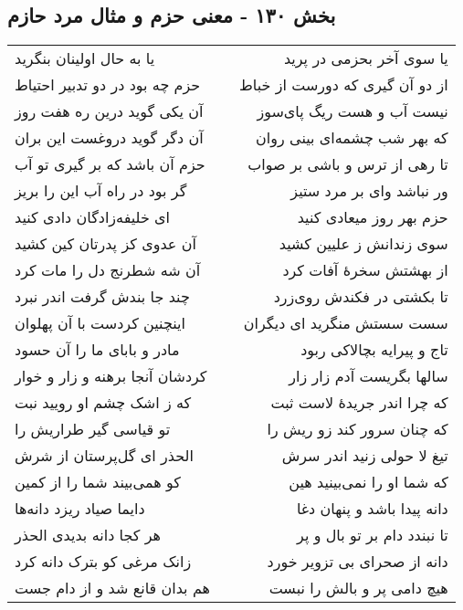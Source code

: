\begin{center}
\section*{بخش ۱۳۰ - معنی حزم و مثال مرد حازم}
\label{sec:sh130}
\begin{longtable}{l p{0.5cm} r}
یا به حال اولینان بنگرید
&&
یا سوی آخر بحزمی در پرید
\\
حزم چه بود در دو تدبیر احتیاط
&&
از دو آن گیری که دورست از خباط
\\
آن یکی گوید درین ره هفت روز
&&
نیست آب و هست ریگ پای‌سوز
\\
آن دگر گوید دروغست این بران
&&
که بهر شب چشمه‌ای بینی روان
\\
حزم آن باشد که بر گیری تو آب
&&
تا رهی از ترس و باشی بر صواب
\\
گر بود در راه آب این را بریز
&&
ور نباشد وای بر مرد ستیز
\\
ای خلیفه‌زادگان دادی کنید
&&
حزم بهر روز میعادی کنید
\\
آن عدوی کز پدرتان کین کشید
&&
سوی زندانش ز علیین کشید
\\
آن شه شطرنج دل را مات کرد
&&
از بهشتش سخرهٔ آفات کرد
\\
چند جا بندش گرفت اندر نبرد
&&
تا بکشتی در فکندش روی‌زرد
\\
اینچنین کردست با آن پهلوان
&&
سست سستش منگرید ای دیگران
\\
مادر و بابای ما را آن حسود
&&
تاج و پیرایه بچالاکی ربود
\\
کردشان آنجا برهنه و زار و خوار
&&
سالها بگریست آدم زار زار
\\
که ز اشک چشم او رویید نبت
&&
که چرا اندر جریدهٔ لاست ثبت
\\
تو قیاسی گیر طراریش را
&&
که چنان سرور کند زو ریش را
\\
الحذر ای گل‌پرستان از شرش
&&
تیغ لا حولی زنید اندر سرش
\\
کو همی‌بیند شما را از کمین
&&
که شما او را نمی‌بینید هین
\\
دایما صیاد ریزد دانه‌ها
&&
دانه پیدا باشد و پنهان دغا
\\
هر کجا دانه بدیدی الحذر
&&
تا نبندد دام بر تو بال و پر
\\
زانک مرغی کو بترک دانه کرد
&&
دانه از صحرای بی تزویر خورد
\\
هم بدان قانع شد و از دام جست
&&
هیچ دامی پر و بالش را نبست
\\
\end{longtable}
\end{center}
